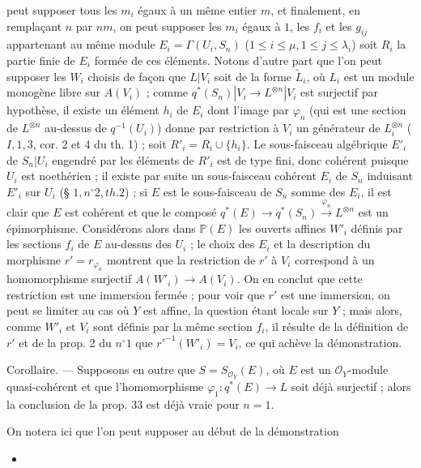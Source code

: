 peut supposer tous les $m_i$ égaux à un même entier $m$, et finalement, en remplaçant $n$ par $nm$, on peut supposer les $m_i$ égaux à $1$, les $f_i$ et les $g_{ij}$ appartenant au même module $E_i = \Gamma(U_i, S_n)$ ($1 \le i \le \mu, 1 \le j \le \lambda_i$) soit $R_i$ la partie finie de $E_i$ formée de ces éléments. Notons d'autre part que l'on peut supposer les $W_i$ choisis de façon que $L|V_i$ soit de la forme $\tilde{L}_i$, où $L_i$ est un module monogène libre sur $A(V_i)$ ; comme $q^*(S_n)|V_i \to L^{\otimes n}|V_i$ est surjectif par hypothèse, il existe un élément $h_i$ de $E_i$ dont l'image par $\varphi_n$ (qui est une section de $L^{\otimes n}$ au-dessus de $q^{-1}(U_i)$) donne par restriction à $V_i$ un générateur de $L_i^{\otimes n}$ ($I, 1, 3$, cor. 2 et 4 du th. 1) ; soit $R'_i = R_i \cup \{h_i\}$. Le sous-faisceau algébrique $E'_i$ de $S_n|U_i$ engendré par les éléments de $R'_i$ est de type fini, donc cohérent puisque $U_i$ est noethérien ; il existe par suite un sous-faisceau cohérent $E_i$ de $S_n$ induisant $E'_i$ sur $U_i$ (§ $1, n^\circ 2, th. 2$) ; si $E$ est le sous-faisceau de $S_n$ somme des $E_i$, il est clair que $E$ est cohérent et que le composé $q^*(E) \to q^*(S_n) \xrightarrow{\varphi_n} L^{\otimes n}$ est un épimorphisme. Considérons alors dans $\mathbb{P}(E)$ les ouverts affines $W'_i$ définis par les sections $f_i$ de $E$ au-dessus des $U_i$ ; le choix des $E_i$ et la description du morphisme $r' = r_{\varphi_n}$ montrent que la restriction de $r'$ à $V_i$ correspond à un homomorphisme surjectif $A(W'_i) \to A(V_i)$. On en conclut que cette restriction est une immersion fermée ; pour voir que $r'$ est une immersion, on peut se limiter au cas où $Y$ est affine, la question étant locale sur $Y$ ; mais alors, comme $W'_i$ et $V_i$ sont définis par la même section $f_i$, il résulte de la définition de $r'$ et de la prop. 2 du $n^\circ 1$ que $r'^{-1}(W'_i) = V_i$, ce qui achève la démonstration.

Corollaire. — Supposons en outre que $S = S_{\mathcal{O}_Y}(E)$, où $E$ est un $\mathcal{O}_Y$-module quasi-cohérent et que l'homomorphisme $\varphi_1 : q^*(E) \to L$ soit déjà surjectif ; alors la conclusion de la prop. 33 est déjà vraie pour $n=1$.

On notera ici que l'on peut supposer au début de la démonstration

\newpage


\begin{itemize}
    \item[— II-105 sextiès —]
\end{itemize}

